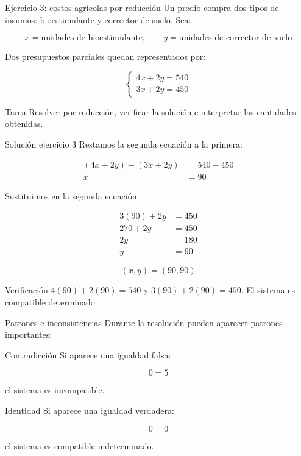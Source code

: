 \documentclass[aspectratio=169]{beamer}
\begin{document}
\begin{frame}{Ejercicio 3: costos agrícolas por reducción}
	\small
	Un predio compra dos tipos de insumos: bioestimulante y corrector de suelo. Sea:
	
	\[
	x=\text{unidades de bioestimulante}, \qquad y=\text{unidades de corrector de suelo}
	\]
	
	Dos presupuestos parciales quedan representados por:
	
	\[
	\begin{cases}
		4x+2y=540\\
		3x+2y=450
	\end{cases}
	\]
	
	\begin{block}{Tarea}
		Resolver por reducción, verificar la solución e interpretar las cantidades obtenidas.
	\end{block}
\end{frame}
	
\begin{frame}{Solución ejercicio 3}
	\small
	Restamos la segunda ecuación a la primera:
	
	\begin{align*}
	(4x+2y)-(3x+2y)&=540-450\\
	x&=90
	\end{align*}
	
	Sustituimos en la segunda ecuación:
	
	\begin{align*}
	3(90)+2y&=450\\
	270+2y&=450\\
	2y&=180\\
	y&=90
	\end{align*}
	
	\[
	\boxed{(x,y)=(90,90)}
	\]
	
	\begin{block}{Verificación}
		\(4(90)+2(90)=540\) y \(3(90)+2(90)=450\). El sistema es compatible determinado.
	\end{block}
\end{frame}
	
\begin{frame}{Patrones e inconsistencias}
	Durante la resolución pueden aparecer patrones importantes:
	
	\bigskip
	
	\begin{block}{Contradicción}
		Si aparece una igualdad falsa:
		
		\[
		0=5
		\]
		
		el sistema es incompatible.
	\end{block}
	
	\begin{block}{Identidad}
		Si aparece una igualdad verdadera:
		
		\[
		0=0
		\]
		
		el sistema es compatible indeterminado.
	\end{block}
\end{frame}
\end{document}
